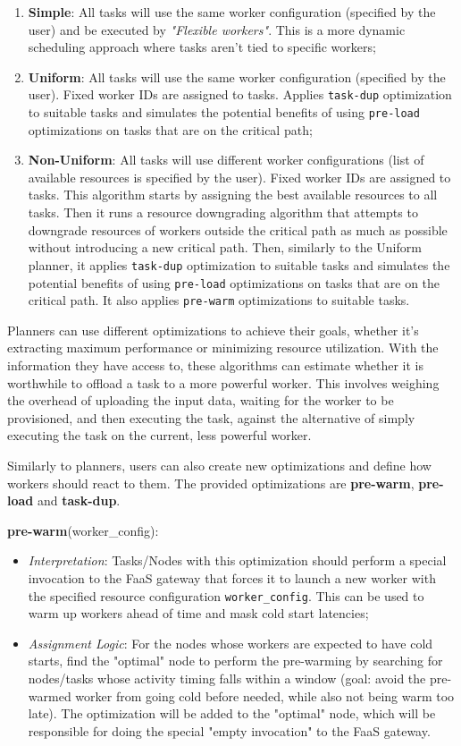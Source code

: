 \documentclass[conference]{IEEEtran}
\begin{document}
\begin{enumerate}
    \item \textbf{Simple}: All tasks will use the same worker configuration (specified by the user) and be executed by \textit{"Flexible workers"}. This is a more dynamic scheduling approach where tasks aren't tied to specific workers;
    \item \textbf{Uniform}: All tasks will use the same worker configuration (specified by the user). Fixed worker IDs are assigned to tasks. Applies \texttt{task-dup} optimization to suitable tasks and simulates the potential benefits of using \texttt{pre-load} optimizations on tasks that are on the critical path;
    \item \textbf{Non-Uniform}: All tasks will use different worker configurations (list of available resources is specified by the user). Fixed worker IDs are assigned to tasks. This algorithm starts by assigning the best available resources to all tasks. Then it runs a resource downgrading algorithm that attempts to downgrade resources of workers outside the critical path as much as possible without introducing a new critical path. Then, similarly to the Uniform planner, it applies \texttt{task-dup} optimization to suitable tasks and simulates the potential benefits of using \texttt{pre-load} optimizations on tasks that are on the critical path. It also applies \texttt{pre-warm} optimizations to suitable tasks.
\end{enumerate}

Planners can use different optimizations to achieve their goals, whether it's extracting maximum performance or minimizing resource utilization. With the information they have access to, these algorithms can estimate whether it is worthwhile to offload a task to a more powerful worker. This involves weighing the overhead of uploading the input data, waiting for the worker to be provisioned, and then executing the task, against the alternative of simply executing the task on the current, less powerful worker.

Similarly to planners, users can also create new optimizations and define how workers should react to them. The provided optimizations are \textbf{pre-warm}, \textbf{pre-load} and \textbf{task-dup}.

\textbf{pre-warm}(worker\_config):
\begin{itemize}
  \item \textit{Interpretation}: Tasks/Nodes with this optimization should perform a special invocation to the FaaS gateway that forces it to launch a new worker with the specified resource configuration \texttt{worker\_config}. This can be used to warm up workers ahead of time and mask cold start latencies;
  \item \textit{Assignment Logic}: For the nodes whose workers are expected to have cold starts, find the "optimal" node to perform the pre-warming by searching for nodes/tasks whose activity timing falls within a window (goal: avoid the pre-warmed worker from going cold before needed, while also not being warm too late). The optimization will be added to the "optimal" node, which will be responsible for doing the special "empty invocation" to the FaaS gateway.
\end{itemize}
\end{document}
